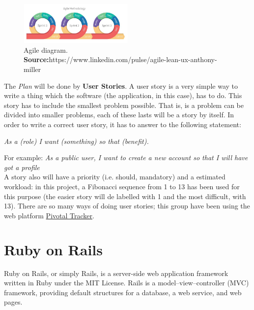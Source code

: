 \begin{figure}[H]
	\centering
    \includegraphics[trim={0 0 0 0},clip,width=0.5\textwidth]{Files/agile.jpg}
    \caption{Agile diagram.\\ \textbf{Source:}https://www.linkedin.com/pulse/agile-lean-ux-anthony-miller}
    \label{fig: Agile}
\end{figure}
The \textit{Plan} will be done by \textbf{User Stories}. A user story is a very simple way to write a thing which the software (the application, in this case), has to do. This story has to include the smallest problem possible. That is, is a problem can be divided into smaller problems, each of these lasts will be a story by itself. In order to write a correct user story, it has to answer to the following statement:
\begin{center}
\textit{As a (role) I want (something) so that (benefit).}
\end{center}
For example: \textit{As a public user, I want to create a new account so that I will have got a profile}\\
A story also will have a priority (i.e. should, mandatory) and a estimated workload: in this project, a Fibonacci sequence from 1 to 13 has been used for this purpose (the easier story will de labelled with 1 and the most difficult, with 13). There are so many ways of doing user stories; this group have been using the web platform \href{https://www.pivotaltracker.com/}{Pivotal Tracker}.

\section{Ruby on Rails} 
Ruby on Rails, or simply Rails, is a server-side web application framework written in Ruby under the MIT License. Rails is a model–view–controller (MVC) framework, providing default structures for a database, a web service, and web pages. \cite{wiki:RoR}

